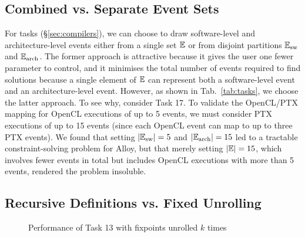 \subsection{Combined vs. Separate Event Sets}

For  tasks (\S\ref{sec:compilers}), we can choose to draw
software-level and architecture-level events either from a single set
$\mathbb{E}$ or from disjoint partitions $\mathbb{E}_{\rm sw}$ and $\mathbb{E}_{\rm arch}$. The former approach
is attractive because it gives the user one fewer parameter to
control, and it minimises the total number of events required to find
solutions because a single element of $\mathbb{E}$ can represent both a
software-level event and an architecture-level event. However, as
shown in Tab.~\ref{tab:tasks}, we choose the latter approach. To see
why, consider Task 17. To validate the OpenCL/PTX mapping for OpenCL
executions of up to 5 events, we must consider PTX executions of up to
15 events (since each OpenCL event can map to up to three PTX events).
We found that setting $\lvert\mathbb{E}_{\rm sw}\rvert = 5$ and $\lvert\mathbb{E}_{\rm arch}\rvert = 15$
led to a tractable constraint-solving problem for Alloy, but that
merely setting $\lvert\mathbb{E}\rvert = 15$, which involves fewer events in
total but includes OpenCL executions with more than 5 events, rendered the problem insoluble.

\subsection{Recursive Definitions vs. Fixed Unrolling}
\label{sec:fixpoints}

\begin{figure}

\def\mybarwidth{6.5pt}

\centering

\vspace*{-3mm}
\caption{Performance of Task 13 with fixpoints unrolled $k$ times} 
\label{fig:fixpoint_results}
\end{figure}

